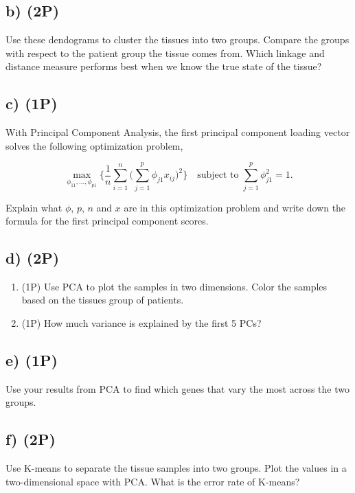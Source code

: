 \documentclass[]{article}
\providecommand{\tightlist}{%
  \setlength{\itemsep}{0pt}\setlength{\parskip}{0pt}}
\begin{document}
\hypertarget{b-2p-2}{%
\subsection{b) (2P)}\label{b-2p-2}}

Use these dendograms to cluster the tissues into two groups. Compare the
groups with respect to the patient group the tissue comes from. Which
linkage and distance measure performs best when we know the true state
of the tissue?

\hypertarget{c-1p}{%
\subsection{c) (1P)}\label{c-1p}}

With Principal Component Analysis, the first principal component loading
vector solves the following optimization problem,

\begin{equation*}
\max_{\phi_{11},...,\phi_{p1}} \Big\{ \frac{1}{n}\sum_{i=1}^n \Big( \sum_{j=1}^p \phi_{j1}x_{ij} \Big)^2  \Big\} \quad \text{subject to } \sum_{j=1}^p\phi_{j1}^2 = 1.
\end{equation*}

Explain what \(\phi\), \(p\), \(n\) and \(x\) are in this optimization
problem and write down the formula for the first principal component
scores.

\hypertarget{d-2p}{%
\subsection{d) (2P)}\label{d-2p}}

\begin{enumerate}
\def\labelenumi{(\roman{enumi})}
\tightlist
\item
  (1P) Use PCA to plot the samples in two dimensions. Color the samples
  based on the tissues group of patients.
\item
  (1P) How much variance is explained by the first 5 PCs?
\end{enumerate}

\hypertarget{e-1p}{%
\subsection{e) (1P)}\label{e-1p}}

Use your results from PCA to find which genes that vary the most across
the two groups.

\hypertarget{f-2p}{%
\subsection{f) (2P)}\label{f-2p}}

Use K-means to separate the tissue samples into two groups. Plot the
values in a two-dimensional space with PCA. What is the error rate of
K-means?
\end{document}
